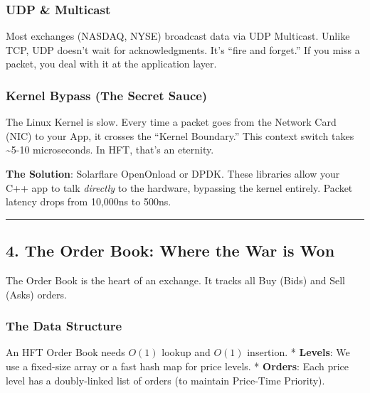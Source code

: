 \hypertarget{udp-multicast}{%
\subsubsection{UDP \& Multicast}\label{udp-multicast}}

Most exchanges (NASDAQ, NYSE) broadcast data via UDP Multicast. Unlike
TCP, UDP doesn't wait for acknowledgments. It's ``fire and forget.'' If
you miss a packet, you deal with it at the application layer.

\hypertarget{kernel-bypass-the-secret-sauce}{%
\subsubsection{Kernel Bypass (The Secret
Sauce)}\label{kernel-bypass-the-secret-sauce}}

The Linux Kernel is slow. Every time a packet goes from the Network Card
(NIC) to your App, it crosses the ``Kernel Boundary.'' This context
switch takes \textasciitilde5-10 microseconds. In HFT, that's an
eternity.

\textbf{The Solution}: Solarflare OpenOnload or DPDK. These libraries
allow your C++ app to talk \emph{directly} to the hardware, bypassing
the kernel entirely. Packet latency drops from 10,000ns to 500ns.

\begin{center}\rule{0.5\linewidth}{0.5pt}\end{center}

\hypertarget{the-order-book-where-the-war-is-won}{%
\subsection{4. The Order Book: Where the War is
Won}\label{the-order-book-where-the-war-is-won}}

The Order Book is the heart of an exchange. It tracks all Buy (Bids) and
Sell (Asks) orders.

\hypertarget{the-data-structure}{%
\subsubsection{The Data Structure}\label{the-data-structure}}

An HFT Order Book needs \(O(1)\) lookup and \(O(1)\) insertion. *
\textbf{Levels}: We use a fixed-size array or a fast hash map for price
levels. * \textbf{Orders}: Each price level has a doubly-linked list of
orders (to maintain Price-Time Priority).

